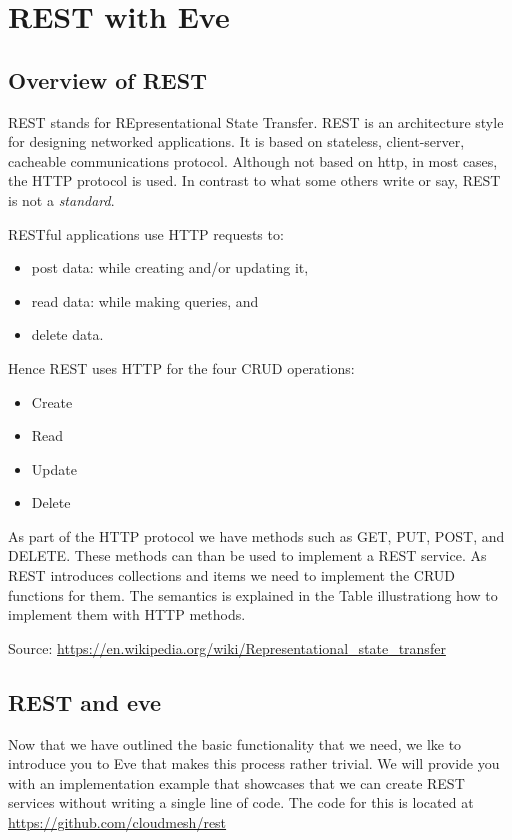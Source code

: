\section{REST with Eve}\label{rest-with-eve}

\subsection{Overview of REST}\label{overview-of-rest}

REST stands for REpresentational State Transfer. REST is an architecture
style for designing networked applications. It is based on stateless,
client-server, cacheable communications protocol. Although not based on
http, in most cases, the HTTP protocol is used. In contrast to what some
others write or say, REST is not a \emph{standard}.

RESTful applications use HTTP requests to:

\begin{itemize}
\item
  post data: while creating and/or updating it,
\item
  read data: while making queries, and
\item
  delete data.
\end{itemize}

Hence REST uses HTTP for the four CRUD operations:

\begin{itemize}
\item
  Create
\item
  Read
\item
  Update
\item
  Delete
\end{itemize}

As part of the HTTP protocol we have methods such as GET, PUT, POST, and
DELETE. These methods can than be used to implement a REST service. As
REST introduces collections and items we need to implement the CRUD
functions for them. The semantics is explained in the Table
illustrationg how to implement them with HTTP methods.

Source:
\url{https://en.wikipedia.org/wiki/Representational_state_transfer}

\subsection{REST and eve}\label{rest-and-eve}

Now that we have outlined the basic functionality that we need, we lke
to introduce you to Eve that makes this process rather trivial. We will
provide you with an implementation example that showcases that we can
create REST services without writing a single line of code. The code for
this is located at \url{https://github.com/cloudmesh/rest}

